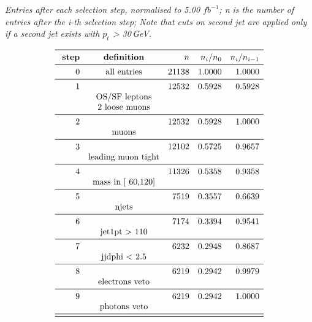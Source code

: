 \documentclass[11pt,a4paper]{article}
\begin{document}
\begin{table}
\caption{\emph{Entries after each selection step, normalised to 5.00 $fb^{-1}$; n is the number of entries after the i-th selection step; Note that cuts on second jet are applied only if a second jet exists with $p_t$ > 30\,GeV.}}
\[
\begin{array}{rcrrr}
\toprule
\ \textbf{step}& \textbf{definition}  & n  &  n_i/n_0 & n_i/n_{i-1}  \\ 
\midrule
 0  & \text{all entries} &  21138 & 1.0000 & 1.0000 \\
\midrule
 1  & &  12532 & 0.5928 & 0.5928 \\
& \text{OS/SF leptons} & & & \\
& \text{2 loose muons} & & & \\
\midrule
 2  & &  12532 & 0.5928 & 1.0000 \\
& \text{muons} & & & \\
\midrule
 3  & &  12102 & 0.5725 & 0.9657 \\
& \text{leading muon tight} & & & \\
\midrule
 4  & &  11326 & 0.5358 & 0.9358 \\
& \text{mass in [ 60,120]} & & & \\
\midrule
 5  & &   7519 & 0.3557 & 0.6639 \\
& \text{njets} & & & \\
\midrule
 6  & &   7174 & 0.3394 & 0.9541 \\
& \text{jet1pt >  110} & & & \\
\midrule
 7  & &   6232 & 0.2948 & 0.8687 \\
& \text{jjdphi < 2.5} & & & \\
\midrule
 8  & &   6219 & 0.2942 & 0.9979 \\
& \text{electrons veto} & & & \\
\midrule
 9  & &   6219 & 0.2942 & 1.0000 \\
& \text{photons veto} & & & \\
\midrule
\bottomrule
\end{array}
\]
\end{table}
\end{document}
